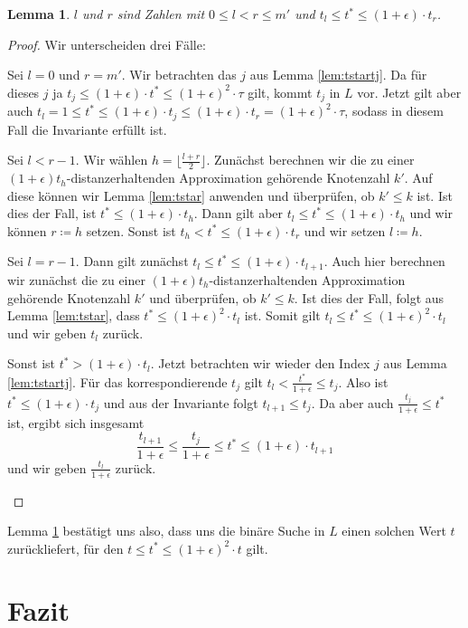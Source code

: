 \documentclass[11pt]{article}
\newtheorem{lemma}[theorem]{Lemma}
\begin{document}
	\begin{lemma}
		\label{lem:invariantmdps}
		$l$ und $r$ sind Zahlen mit $0 \leq l < r \leq m'$ und $t_l \leq t^* \leq (1 + \epsilon)\cdot t_r$.
	\end{lemma}
	\begin{proof}
		Wir unterscheiden drei Fälle:
		\begin{description}[topsep=0mm, itemsep=0mm]
			\item[Fall 1:] Sei $l = 0$ und $r = m'$.
			Wir betrachten das $j$ aus Lemma \ref{lem:tstartj}. 
			Da für dieses $j$ ja $t_j \leq (1 + \epsilon) \cdot t^* \leq (1 + \epsilon)^2 \cdot \tau$ gilt, kommt $t_j$ in $L$ vor. 
			Jetzt gilt aber auch $t_l = 1 
			\leq t^* 
			\leq (1 + \epsilon) \cdot t_j 
			\leq (1 + \epsilon) \cdot t_r 
			= (1 + \epsilon)^2 \cdot \tau$, sodass in diesem Fall die Invariante erfüllt ist.
			
			\item[Fall 2:] Sei $l < r-1$. 
			Wir wählen $h = \lfloor \frac{l + r}{2} \rfloor$. 
			Zunächst berechnen wir die zu einer $(1 + \epsilon)t_h$-distanzerhaltenden Approximation gehörende Knotenzahl $k'$. 
			Auf diese können wir Lemma \ref{lem:tstar} anwenden und überprüfen, ob $k' \leq k$ ist.
			Ist dies der Fall, ist $t^* \leq (1 + \epsilon) \cdot t_h$. 
			Dann gilt aber $t_l \leq t^* \leq  (1 + \epsilon) \cdot t_h$ und wir können $r \coloneqq h$ setzen. 
			Sonst ist $t_h < t^* \leq (1 + \epsilon)\cdot t_r$ und wir setzen $l \coloneqq h$.
			
			\item[Fall 3:] Sei $l = r - 1$. Dann gilt zunächst $t_l \leq t^* \leq (1 + \epsilon)\cdot t_{l+1}$. 
			Auch hier berechnen wir zunächst die zu einer $(1 + \epsilon)t_h$-distanzerhaltenden Approximation gehörende Knotenzahl $k'$ und überprüfen, ob $k' \leq k$.
			Ist dies der Fall, folgt aus Lemma \ref{lem:tstar}, dass $t^* \leq (1 + \epsilon)^2 \cdot t_l$ ist. 
			Somit gilt $t_l \leq t^* \leq (1 + \epsilon)^2 \cdot t_l$ und wir geben $t_l$ zurück.
			
			Sonst ist $t^* > (1 + \epsilon)\cdot t_l$. 
			Jetzt betrachten wir wieder den Index $j$ aus Lemma \ref{lem:tstartj}. 
			Für das korrespondierende $t_j$ gilt $t_l < \frac{t^*}{1 + \epsilon} \leq t_j$. Also ist $t^* \leq (1 + \epsilon) \cdot t_j$ und aus der Invariante folgt $t_{l+1} \leq t_j$.
			Da aber auch $\frac{t_j}{1 + \epsilon} \leq t^*$ ist, ergibt sich insgesamt 
			\[
			\frac{t_{l+1}}{1 + \epsilon} 
			\leq \frac{t_j}{1 + \epsilon} 
			\leq t^* 
			\leq (1 + \epsilon) \cdot t_{l+1}
			\]
			und wir geben $\frac{t_l}{1 + \epsilon}$ zurück.
		\end{description}
	\end{proof}
	
	Lemma \ref{lem:invariantmdps} bestätigt uns also, dass uns die binäre Suche in $L$ einen solchen Wert $t$ zurückliefert, für den $t \leq t^* \leq (1 + \epsilon)^2 \cdot t$ gilt.
	
	\section{Fazit}
    \label{sec:fazit}

    
    
\end{document}
